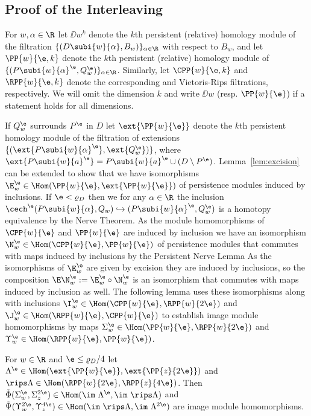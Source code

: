 
\subsection{Proof of the Interleaving}

For $w,\alpha\in\R$ let $\DD{w}^k$ denote the $k$th persistent (relative) homology module of the filtration $\{(D\subi{w}{\alpha},B_w)\}_{\alpha\in\R}$ with respect to $B_w$, and let $\PP{w}{\e,k}$ denote the $k$th persistent (relative) homology module of $\{(P\subi{w}{\alpha}^\e,Q_w^\e)\}_{\alpha\in\R}$.
Similarly, let $\CPP{w}{\e,k}$ and $\RPP{w}{\e,k}$ denote the corresponding \Cech and Vietoris-Rips filtrations, respectively.
We will omit the dimension $k$ and write $\DD{w}$ (resp. $\PP{w}{\e}$) if a statement holds for all dimensions.

If $Q_w^\e$ surrounds $P^\e$ in $D$ let $\ext{\PP{w}{\e}}$ denote the $k$th persistent homology module of the filtration of extensions $\{(\ext{P\subi{w}{\alpha}^\e},\ext{Q_w^\e})\}$, where $\ext{P\subi{w}{a}^\e} = P\subi{w}{a}^\e \cup (D\setminus P^\e)$.
Lemma~\ref{lem:excision} can be extended to show that we have isomorphisms $\E_w^\e \in \Hom(\PP{w}{\e},\ext{\PP{w}{\e}})$
of persistence modules induced by inclusions.
If $\e < \varrho_D$ then we for any $\alpha\in\R$ the inclusion $\cech^\e(P\subi{w}{\alpha}, Q_w)\hookrightarrow (P\subi{w}{\alpha}^\e, Q_w^\e)$ is a homotopy equivalence by the Nerve Theorem.
As the module homomorphisms of $\CPP{w}{\e}$ and $\PP{w}{\e}$ are induced by inclusion we have an isomorphism $\N_w^\e\in\Hom(\CPP{w}{\e}, \PP{w}{\e})$ of persistence modules that commutes with maps induced by inclusions by the Persistent Nerve Lemma
As the isomorphisms of $\E_w^\e$ are given by excision they are induced by inclusions, so the composition $\E\N_w^\e := \E_w^\e\circ \N_w^\e$ is an isomorphism that commutes with maps induced by inclusion as well.
The following lemma uses these isomorphisms along with inclusions $\I_w^\e\in\Hom(\CPP{w}{\e}, \RPP{w}{2\e})$ and $\J_w^\e\in\Hom(\RPP{w}{\e},\CPP{w}{\e})$ to establish image module homomorphisms by maps $\Sigma_w^\e\in\Hom(\PP{w}{\e},\RPP{w}{2\e})$ and $\Upsilon_w^\e\in \Hom(\RPP{w}{\e},\PP{w}{\e})$.

\begin{lemma}\label{lem:rips_homomorphism_left}
  For $w\in\R$ and $\e \leq\varrho_D / 4$ let $\Lambda^\e\in\Hom(\ext{\PP{w}{\e}}, \ext{\PP{z}{2\e}})$ and $\rips\Lambda\in\Hom(\RPP{w}{2\e},\RPP{z}{4\e})$.
  Then $\tilde{\Phi}(\Sigma_w^\e,\Sigma_z^{2\e})\in\Hom(\im~\Lambda^\e,\im~\rips\Lambda)$ and $\tilde{\Psi}(\Upsilon_w^{2\e},\Upsilon_z^{4\e})\in\Hom(\im~\rips\Lambda,\im~\Lambda^{2\e})$ are image module homomorphisms.
\end{lemma}

